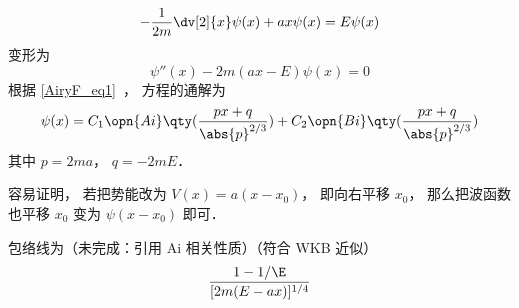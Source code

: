 

\begin{equation}
-\frac{1}{2m}\dv[2]{x}\psi(x) + ax \psi(x) = E\psi(x)
\end{equation}
变形为
\begin{equation}
\psi''(x) - 2m(ax - E)\psi(x) = 0
\end{equation}
根据 \autoref{AiryF_eq1}~， 方程的通解为
\begin{equation}
\psi(x) = C_1\opn{Ai}\qty(\frac{px+q}{\abs{p}^{2/3}}) + C_2 \opn{Bi}\qty(\frac{px+q}{\abs{p}^{2/3}})
\end{equation}
其中 $p = 2ma$， $q = -2mE$．

容易证明， 若把势能改为 $V(x) = a(x-x_0)$， 即向右平移 $x_0$， 那么把波函数也平移 $x_0$ 变为 $\psi(x-x_0)$ 即可．

包络线为（未完成：引用 Ai 相关性质）（符合 WKB 近似）
\begin{equation}
\frac{1-1/\E}{[2m(E-ax)]^{1/4}} 
\end{equation}

